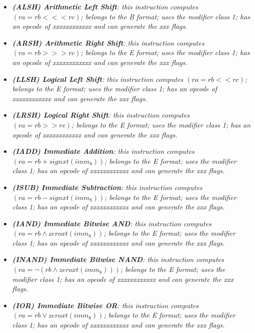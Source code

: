 \begin{multicols}{2}
\begin{itemize}
                \item \textit{\textbf{(ALSH) Arithmetic Left Shift}: this instruction computes \((ra = rb <<< rc)\); belongs to the B format; uses the modifier class 1; has an opcode of xxxxxxxxxxxx and can generate the xxx flags.}

                \item \textit{\textbf{(ARSH) Arithmetic Right Shift}: this instruction computes \((ra = rb >>> rc)\); belongs to the E format; uses the modifier class 1; has an opcode of xxxxxxxxxxxx and can generate the xxx flags.}

                \item \textit{\textbf{(LLSH) Logical Left Shift}: this instruction computes \((ra = rb << rc)\); belongs to the E format; uses the modifier class 1; has an opcode of xxxxxxxxxxxx and can generate the xxx flags.}

                \item \textit{\textbf{(LRSH) Logical Right Shift}: this instruction computes \((ra = rb >> rc)\); belongs to the E format; uses the modifier class 1; has an opcode of xxxxxxxxxxxx and can generate the xxx flags.}

                \item \textit{\textbf{(IADD) Immediate Addition}: this instruction computes \((ra = rb + signxt(imm_8))\); belongs to the E format; uses the modifier class 1; has an opcode of xxxxxxxxxxxx and can generate the xxx flags.}

                \item \textit{\textbf{(ISUB) Immediate Subtraction}: this instruction computes \((ra = rb - signxt(imm_8))\); belongs to the E format; uses the modifier class 1; has an opcode of xxxxxxxxxxxx and can generate the xxx flags.}

                \item \textit{\textbf{(IAND) Immediate Bitwise AND}: this instruction computes \((ra = rb \wedge zeroxt(imm_8))\); belongs to the E format; uses the modifier class 1; has an opcode of xxxxxxxxxxxx and can generate the xxx flags.}

                \item \textit{\textbf{(INAND) Immediate Bitwise NAND}: this instruction computes \((ra = \neg(rb \wedge zeroxt(imm_8)))\); belongs to the E format; uses the modifier class 1; has an opcode of xxxxxxxxxxxx and can generate the xxx flags.}

                \item \textit{\textbf{(IOR) Immediate Bitwise OR}: this instruction computes \((ra = rb \vee zeroxt(imm_8))\); belongs to the E format; uses the modifier class 1; has an opcode of xxxxxxxxxxxx and can generate the xxx flags.}


\end{itemize}
\end{multicols}
